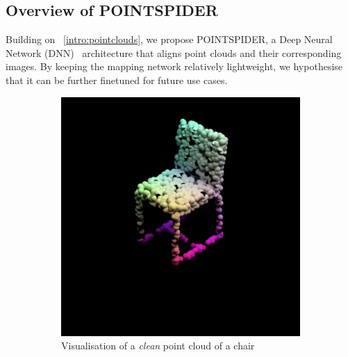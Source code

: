\documentclass[letterpaper, 10 pt, conference]{ieeeconf}  %
\begin{document}
\subsection{Overview of POINTSPIDER}
\label{intro:pointspider}
Building on ~\ref{intro:pointclouds}, we propose POINTSPIDER, a Deep Neural Network (DNN)~\cite{aggarwal2018neural} architecture that aligns point clouds and their corresponding images. By keeping the mapping network relatively lightweight, we hypothesise that it can be further finetuned for future use cases. 


\begin{figure}
\centering
\begin{subfigure}{0.20\textwidth}
    \includegraphics[width=\textwidth]{modelnet_40_clean_sample.png}
    \caption{Visualisation of a \textit{clean} point cloud of a chair}
    \label{modelnetc:clean}
\end{subfigure}
\hfill
\begin{subfigure}{0.20\textwidth}

\end{subfigure}
\end{figure}
\end{document}
